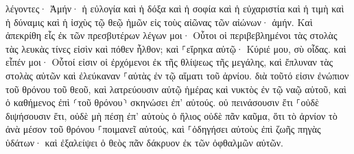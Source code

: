 \documentclass{openreader}
\begin{document}
λέγοντες· Ἀμήν· ἡ εὐλογία καὶ ἡ δόξα καὶ ἡ σοφία καὶ ἡ εὐχαριστία καὶ ἡ τιμὴ καὶ ἡ δύναμις καὶ ἡ ἰσχὺς τῷ θεῷ ἡμῶν εἰς τοὺς αἰῶνας τῶν αἰώνων· ἀμήν. 
Καὶ ἀπεκρίθη εἷς ἐκ τῶν πρεσβυτέρων λέγων μοι· Οὗτοι οἱ περιβεβλημένοι τὰς στολὰς τὰς λευκὰς τίνες εἰσὶν καὶ πόθεν ἦλθον; 
καὶ ⸀εἴρηκα αὐτῷ· Κύριέ μου, σὺ οἶδας. καὶ εἶπέν μοι· Οὗτοί εἰσιν οἱ ἐρχόμενοι ἐκ τῆς θλίψεως τῆς μεγάλης, καὶ ἔπλυναν τὰς στολὰς αὐτῶν καὶ ἐλεύκαναν ⸀αὐτὰς ἐν τῷ αἵματι τοῦ ἀρνίου. 
διὰ τοῦτό εἰσιν ἐνώπιον τοῦ θρόνου τοῦ θεοῦ, καὶ λατρεύουσιν αὐτῷ ἡμέρας καὶ νυκτὸς ἐν τῷ ναῷ αὐτοῦ, καὶ ὁ καθήμενος ἐπὶ ⸂τοῦ θρόνου⸃ σκηνώσει ἐπ’ αὐτούς. 
οὐ πεινάσουσιν ἔτι ⸀οὐδὲ διψήσουσιν ἔτι, οὐδὲ μὴ πέσῃ ἐπ’ αὐτοὺς ὁ ἥλιος οὐδὲ πᾶν καῦμα, 
ὅτι τὸ ἀρνίον τὸ ἀνὰ μέσον τοῦ θρόνου ⸀ποιμανεῖ αὐτούς, καὶ ⸀ὁδηγήσει αὐτοὺς ἐπὶ ζωῆς πηγὰς ὑδάτων· καὶ ἐξαλείψει ὁ θεὸς πᾶν δάκρυον ἐκ τῶν ὀφθαλμῶν αὐτῶν. 
\end{document}
